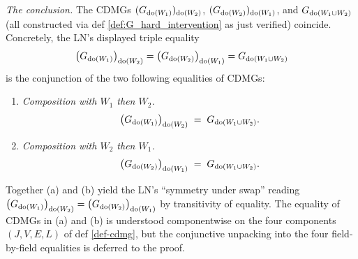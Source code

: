 \begin{Lem}
    \emph{The conclusion.} The CDMGs $(G_{\operatorname{do}(W_1)})_{\operatorname{do}(W_2)}$, $(G_{\operatorname{do}(W_2)})_{\operatorname{do}(W_1)}$, and $G_{\operatorname{do}(W_1 \cup W_2)}$ (all constructed via def \ref{def:G_hard_intervention} as just verified) coincide. Concretely, the LN's displayed triple equality
    \[ \left ( G_{\operatorname{do}(W_1)} \right )_{\operatorname{do}(W_2)} = \left ( G_{\operatorname{do}(W_2)} \right )_{\operatorname{do}(W_1)} = G_{\operatorname{do}(W_1 \cup W_2)} \]
    is the conjunction of the two following equalities of CDMGs:
    \begin{enumerate}[label=(\alph*)]
        \item \emph{Composition with $W_1$ then $W_2$.}
              \[ \left ( G_{\operatorname{do}(W_1)} \right )_{\operatorname{do}(W_2)} \;=\; G_{\operatorname{do}(W_1 \cup W_2)}. \]
        \item \emph{Composition with $W_2$ then $W_1$.}
              \[ \left ( G_{\operatorname{do}(W_2)} \right )_{\operatorname{do}(W_1)} \;=\; G_{\operatorname{do}(W_1 \cup W_2)}. \]
    \end{enumerate}
    Together (a) and (b) yield the LN's ``symmetry under swap'' reading $\left ( G_{\operatorname{do}(W_1)} \right )_{\operatorname{do}(W_2)} = \left ( G_{\operatorname{do}(W_2)} \right )_{\operatorname{do}(W_1)}$ by transitivity of equality. The equality of CDMGs in (a) and (b) is understood componentwise on the four components $(J, V, E, L)$ of def \ref{def-cdmg}, but the conjunctive unpacking into the four field-by-field equalities is deferred to the proof.

\end{Lem}

